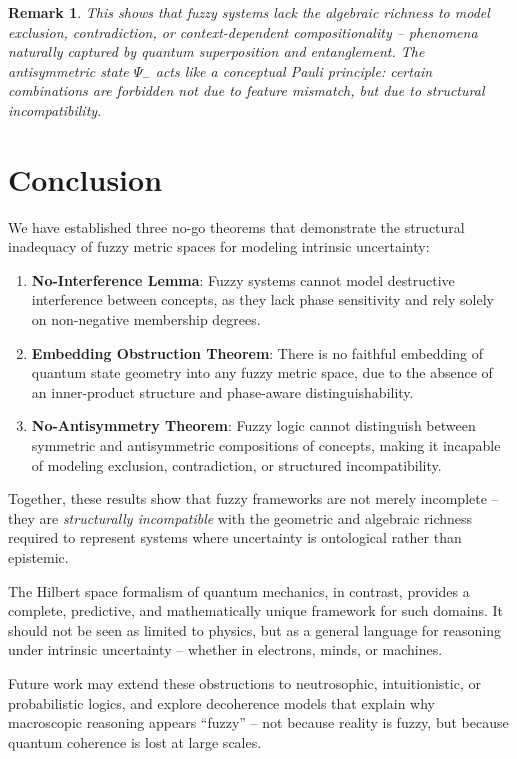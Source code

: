 \documentclass{article}
\newtheorem{remark}[theorem]{Remark}
\begin{document}
\begin{remark}
This shows that fuzzy systems lack the algebraic richness to model exclusion, contradiction, or context-dependent compositionality -- phenomena naturally captured by quantum superposition and entanglement. The antisymmetric state $\Psi_-$ acts like a \emph{conceptual Pauli principle}: certain combinations are forbidden not due to feature mismatch, but due to structural incompatibility.
\end{remark}

\section{Conclusion}

We have established three no-go theorems that demonstrate the structural inadequacy of fuzzy metric spaces for modeling intrinsic uncertainty:

\begin{enumerate}
    \item \textbf{No-Interference Lemma}: Fuzzy systems cannot model destructive interference between concepts, as they lack phase sensitivity and rely solely on non-negative membership degrees.
    \item \textbf{Embedding Obstruction Theorem}: There is no faithful embedding of quantum state geometry into any fuzzy metric space, due to the absence of an inner-product structure and phase-aware distinguishability.
    \item \textbf{No-Antisymmetry Theorem}: Fuzzy logic cannot distinguish between symmetric and antisymmetric compositions of concepts, making it incapable of modeling exclusion, contradiction, or structured incompatibility.
\end{enumerate}

Together, these results show that fuzzy frameworks are not merely incomplete -- they are \emph{structurally incompatible} with the geometric and algebraic richness required to represent systems where uncertainty is ontological rather than epistemic.

The Hilbert space formalism of quantum mechanics, in contrast, provides a complete, predictive, and mathematically unique framework for such domains. It should not be seen as limited to physics, but as a general language for reasoning under intrinsic uncertainty -- whether in electrons, minds, or machines.

Future work may extend these obstructions to neutrosophic, intuitionistic, or probabilistic logics, and explore decoherence models that explain why macroscopic reasoning appears “fuzzy” -- not because reality is fuzzy, but because quantum coherence is lost at large scales.
\end{document}

